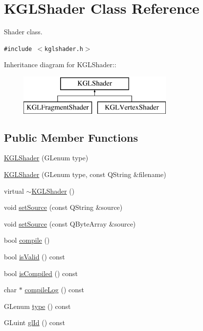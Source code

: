 \hypertarget{class_k_g_l_shader}{
\section{KGLShader Class Reference}
\label{class_k_g_l_shader}
}
Shader class.  


{\tt \#include $<$kglshader.h$>$}

Inheritance diagram for KGLShader::\begin{figure}[H]
\begin{center}
\leavevmode
\includegraphics[height=2cm]{class_k_g_l_shader}
\end{center}
\end{figure}
\subsection*{Public Member Functions}
\begin{CompactItemize}
\item 
\hyperlink{class_k_g_l_shader_d248b6b4159c8ef1c421f64f15f3a2bf}{KGLShader} (GLenum type)
\item 
\hyperlink{class_k_g_l_shader_a314186b1c41653d6418c9cbcc673ca7}{KGLShader} (GLenum type, const QString \&filename)
\item 
virtual \hyperlink{class_k_g_l_shader_bec62fc31823215df69160d442944bfc}{$\sim$KGLShader} ()
\item 
void \hyperlink{class_k_g_l_shader_053304f7caa6280d1485f4c89ef2d76f}{setSource} (const QString \&source)
\item 
void \hyperlink{class_k_g_l_shader_a76416255c6cb080de7a92a553129bb9}{setSource} (const QByteArray \&source)
\item 
bool \hyperlink{class_k_g_l_shader_4ab00f3c14eac360fa989209831bc157}{compile} ()
\item 
bool \hyperlink{class_k_g_l_shader_62c2bb3789a5baaa28cd68167e973728}{isValid} () const 
\item 
bool \hyperlink{class_k_g_l_shader_490ad591f21b032aa59ab5c12813f7e8}{isCompiled} () const 
\item 
char $\ast$ \hyperlink{class_k_g_l_shader_f42dca3d4d145a34ea2c2382699a2f19}{compileLog} () const 
\item 
GLenum \hyperlink{class_k_g_l_shader_c059d873e4ed8c305373818da8caf9f2}{type} () const 
\item 
GLuint \hyperlink{class_k_g_l_shader_4a54ab05e1fa2255370fe0145548f0ac}{glId} () const 
\end{CompactItemize}
